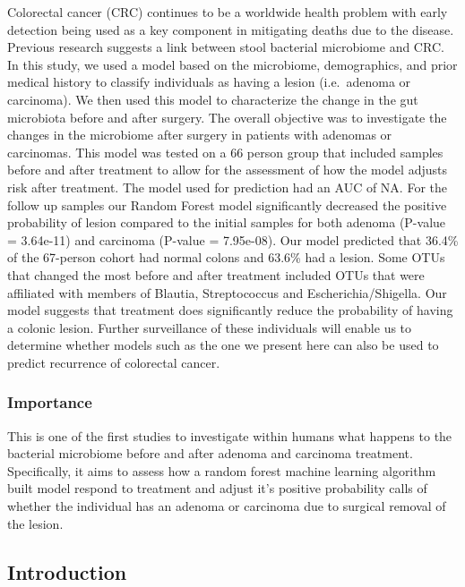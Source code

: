 \documentclass[12pt,]{article}
\begin{document}
Colorectal cancer (CRC) continues to be a worldwide health problem with
early detection being used as a key component in mitigating deaths due
to the disease. Previous research suggests a link between stool
bacterial microbiome and CRC. In this study, we used a model based on
the microbiome, demographics, and prior medical history to classify
individuals as having a lesion (i.e.~adenoma or carcinoma). We then used
this model to characterize the change in the gut microbiota before and
after surgery. The overall objective was to investigate the changes in
the microbiome after surgery in patients with adenomas or carcinomas.
This model was tested on a 66 person group that included samples before
and after treatment to allow for the assessment of how the model adjusts
risk after treatment. The model used for prediction had an AUC of NA.
For the follow up samples our Random Forest model significantly
decreased the positive probability of lesion compared to the initial
samples for both adenoma (P-value = 3.64e-11) and carcinoma (P-value =
7.95e-08). Our model predicted that 36.4\% of the 67-person cohort had
normal colons and 63.6\% had a lesion. Some OTUs that changed the most
before and after treatment included OTUs that were affiliated with
members of Blautia, Streptococcus and Escherichia/Shigella. Our model
suggests that treatment does significantly reduce the probability of
having a colonic lesion. Further surveillance of these individuals will
enable us to determine whether models such as the one we present here
can also be used to predict recurrence of colorectal cancer.

\newpage

\subsubsection{Importance}\label{importance}

This is one of the first studies to investigate within humans what
happens to the bacterial microbiome before and after adenoma and
carcinoma treatment. Specifically, it aims to assess how a random forest
machine learning algorithm built model respond to treatment and adjust
it's positive probability calls of whether the individual has an adenoma
or carcinoma due to surgical removal of the lesion.

\newpage

\subsection{Introduction}\label{introduction}
\end{document}
